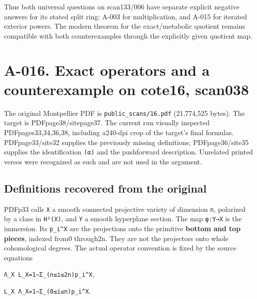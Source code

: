 \documentclass[
  10pt,
]{article}
\begin{document}
Thus both universal questions on scan133/006 have separate explicit
negative answers for its stated split ring: A-003 for multiplication,
and A-015 for iterated exterior powers. The modern theorem for the
exact/metabolic quotient remains compatible with both counterexamples
through the explicitly given quotient map.

\section{A-016. Exact operators and a counterexample on cote16,
scan038}\label{a-016.-exact-operators-and-a-counterexample-on-cote16-scan038}

The original Montpellier PDF is
\texttt{\small public\_\allowbreak{}scans/\allowbreak{}16.pdf}
(21,774,525 bytes). The target is PDFpage38/sitepage37. The current run
visually inspected PDFpages33,34,36,38, including a240-dpi crop of the
target's final formulas. PDFpage33/site32 supplies the previously
missing definitions; PDFpage36/site35 supplies the identification
\texttt{\small (\allowbreak{}α)\allowbreak{}} and the pushforward
description. Unrelated printed versos were recognized as such and are
not used in the argument.

\subsection{Definitions recovered from the
original}\label{definitions-recovered-from-the-original}

PDFp33 calls \texttt{\small X} a smooth connected projective variety of
dimension \texttt{\small n}, polarized by a class in
\texttt{\small H²(\allowbreak{}X)\allowbreak{}}, and \texttt{\small Y} a
smooth hyperplane section. The map
\texttt{\small φ:\allowbreak{}Y→\allowbreak{}X} is the immersion. Its
\texttt{\small p\_\allowbreak{}i\textasciicircum{}X} are the projections
onto the primitive \textbf{bottom and top pieces}, indexed from0
through2n. They are not the projectors onto whole cohomological degrees.
The actual operator convention is fixed by the source equations

\texttt{\small Λ\_\allowbreak{}X L\_\allowbreak{}X=\allowbreak{}1−Σ\_\allowbreak{}(\allowbreak{}n≤\allowbreak{}i≤\allowbreak{}2n)\allowbreak{}p\_\allowbreak{}i\textasciicircum{}X},

\texttt{\small L\_\allowbreak{}X Λ\_\allowbreak{}X=\allowbreak{}1−Σ\_\allowbreak{}(\allowbreak{}0≤\allowbreak{}i≤\allowbreak{}n)\allowbreak{}p\_\allowbreak{}i\textasciicircum{}X}.
\end{document}
